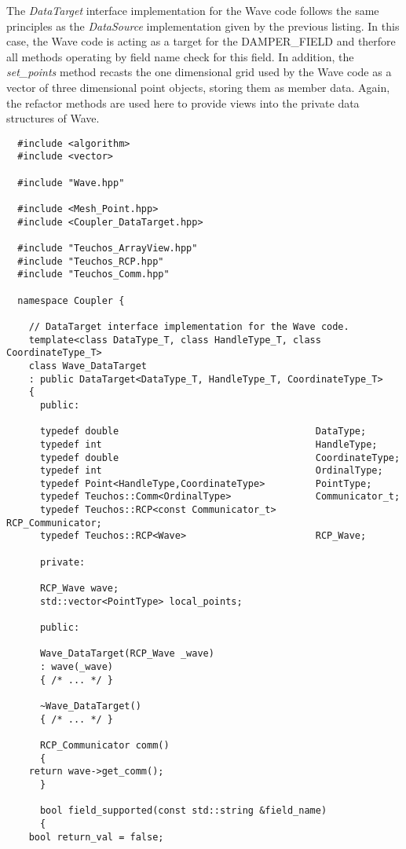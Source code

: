 \documentclass[letterpaper]{article}
\begin{document}
The {\sl DataTarget} interface implementation for the Wave code
follows the same principles as the {\sl DataSource} implementation
given by the previous listing. In this case, the Wave code is acting
as a target for the DAMPER\_FIELD and therfore all methods operating
by field name check for this field. In addition, the {\sl set\_points}
method recasts the one dimensional grid used by the Wave code as a
vector of three dimensional point objects, storing them as member
data. Again, the refactor methods are used here to provide views into
the private data structures of Wave.

\begin{lstlisting}
  #include <algorithm>
  #include <vector>

  #include "Wave.hpp"

  #include <Mesh_Point.hpp>
  #include <Coupler_DataTarget.hpp>

  #include "Teuchos_ArrayView.hpp"
  #include "Teuchos_RCP.hpp"
  #include "Teuchos_Comm.hpp"

  namespace Coupler {

    // DataTarget interface implementation for the Wave code.
    template<class DataType_T, class HandleType_T, class CoordinateType_T>
    class Wave_DataTarget 
    : public DataTarget<DataType_T, HandleType_T, CoordinateType_T>
    {
      public:

      typedef double                                   DataType;
      typedef int                                      HandleType;
      typedef double                                   CoordinateType;
      typedef int                                      OrdinalType;
      typedef Point<HandleType,CoordinateType>         PointType;
      typedef Teuchos::Comm<OrdinalType>               Communicator_t;
      typedef Teuchos::RCP<const Communicator_t>       RCP_Communicator;
      typedef Teuchos::RCP<Wave>                       RCP_Wave;

      private:

      RCP_Wave wave;
      std::vector<PointType> local_points;

      public:

      Wave_DataTarget(RCP_Wave _wave)
      : wave(_wave)
      { /* ... */ }

      ~Wave_DataTarget()
      { /* ... */ }

      RCP_Communicator comm()
      {
	return wave->get_comm();
      }

      bool field_supported(const std::string &field_name)
      {
	bool return_val = false;


\end{lstlisting}
\end{document}

